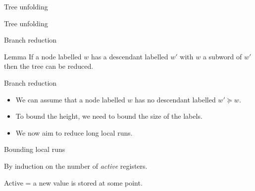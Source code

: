 \documentclass{beamer}
\begin{document}
\begin{frame}
	\tableofcontents[currentsubsection]
\end{frame}

\begin{frame}{Tree unfolding}
	
	
	
\end{frame}

\begin{frame}{Tree unfolding}
	
	
\end{frame}

\begin{frame}{Branch reduction}
	
	\begin{block}{Lemma}
		If a node labelled $w$ has a descendant labelled $w'$ with $w$ a subword of $w'$ then the tree can be reduced.
	\end{block}
	
	
\end{frame}

\begin{frame}{Branch reduction}
	\begin{itemize}
		\item We can assume that a node labelled $w$ has no descendant labelled $w' \succeq w$.
		
		\item To bound the height, we need to bound the size of the labels.
		
		\item We now aim to reduce long local runs.
	\end{itemize}
\end{frame}

\begin{frame}{Bounding local runs}
	
	
	By induction on the number of \color{blue}\emph{active }\color{black} registers.
	
	\color{purple}Active \color{black} = a new value is stored at some point.
	\vspace{0.5cm}
	
	
	
\end{frame}
\end{document}

